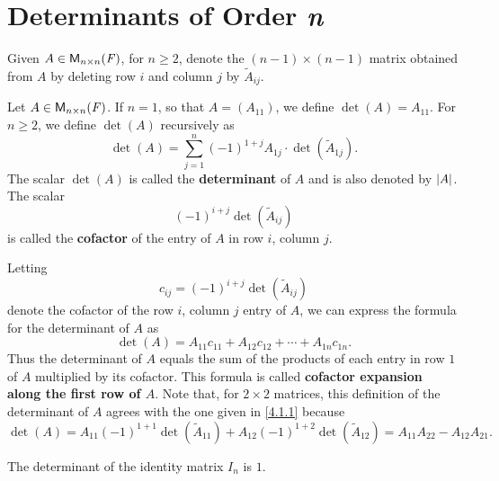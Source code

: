 \section{Determinants of Order \textit{n}}\label{sec:4.2}

\begin{defn}\label{4.2.1}
  Given \(A \in \mathsf{M}_{{n} \times n}({\mathit{F}})\), for \(n \geq 2\), denote the \((n - 1) \times (n - 1)\) matrix obtained from \(A\) by deleting row \(i\) and column \(j\) by \(\tilde{A}_{i j}\).
\end{defn}

\begin{defn}\label{4.2.2}
  Let \(A \in \mathsf{M}_{{n} \times n}({\mathit{F}})\).
  If \(n = 1\), so that \(A = (A_{1 1})\), we define \(\det(A) = A_{1 1}\).
  For \(n \geq 2\), we define \(\det(A)\) recursively as
  \[
    \det(A) = \sum_{j = 1}^n (-1)^{1 + j} A_{1 j} \cdot \det(\tilde{A}_{1 j}).
  \]
  The scalar \(\det(A)\) is called the \textbf{determinant} of \(A\) and is also denoted by \(\left\lvert A\right\rvert\).
  The scalar
  \[
    (-1)^{i + j} \det(\tilde{A}_{i j})
  \]
  is called the \textbf{cofactor} of the entry of \(A\) in row \(i\), column \(j\).

  Letting
  \[
    c_{i j} = (-1)^{i + j} \det(\tilde{A}_{i j})
  \]
  denote the cofactor of the row \(i\), column \(j\) entry of \(A\), we can express the formula for the determinant of \(A\) as
  \[
    \det(A) = A_{1 1} c_{1 1} + A_{1 2} c_{1 2} + \cdots + A_{1 n} c_{1 n}.
  \]
  Thus the determinant of \(A\) equals the sum of the products of each entry in row \(1\) of \(A\) multiplied by its cofactor.
  This formula is called \textbf{cofactor expansion along the first row of \(A\)}.
  Note that, for \(2 \times 2\) matrices, this definition of the determinant of \(A\) agrees with the one given in \cref{4.1.1} because
  \[
    \det(A) = A_{1 1} (-1)^{1 + 1} \det(\tilde{A}_{1 1}) + A_{1 2} (-1)^{1 + 2} \det(\tilde{A}_{1 2}) = A_{1 1} A_{2 2} - A_{1 2} A_{2 1}.
  \]
\end{defn}

\begin{eg}\label{4.2.3}
  The determinant of the identity matrix \(I_n\) is \(1\).
\end{eg}

